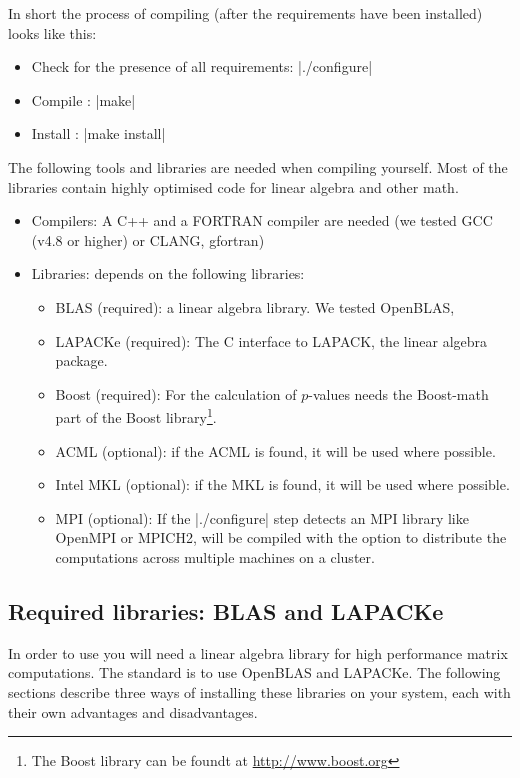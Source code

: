 In short the process of compiling \oanomm (after the requirements have
been installed) looks like this:
\begin{itemize}
\item Check for the presence of all requirements: |./configure|
\item Compile \oanomm: |make|
\item Install \oanomm: |make install|
\end{itemize}

The following tools and libraries are needed when compiling \oanomm
yourself. Most of the libraries contain highly optimised code for
linear algebra and other math.
\begin{itemize}
\item Compilers: A C++ and a FORTRAN compiler are needed (we tested
  GCC (v4.8 or higher) or CLANG, gfortran)
\item Libraries: \oanomm depends on the following libraries:
  \begin{itemize}
  \item \acs{BLAS} (required): a linear algebra library. We tested OpenBLAS,
  \item LAPACKe (required): The C interface to LAPACK, the linear
    algebra package.
  \item Boost (required): For the calculation of $p$-values \oanomm
    needs the Boost-math part of the Boost library\footnote{The Boost
      library can be foundt at \url{http://www.boost.org}}.
  \item \ac{ACML} (optional): if the \ac{ACML} is found,
    it will be used where possible.
  \item Intel \ac{MKL} (optional): if the \ac{MKL} is
    found, it will be used where possible.
  \item \acs{MPI} (optional): If the |./configure| step detects an
    \acf{MPI} library like OpenMPI or MPICH2, \oanomm will be compiled
    with the option to distribute the computations across multiple
    machines on a cluster.
  \end{itemize}
\end{itemize}


\subsection{Required libraries: \ac{BLAS} and LAPACKe}
In order to use \oanomm you will need a linear algebra library for
high performance matrix computations. The standard is to use OpenBLAS
and LAPACKe. The following sections describe three ways of installing
these libraries on your system, each with their own advantages and
disadvantages.


